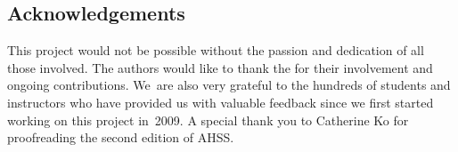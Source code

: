\subsection*{{\color{oiB}Acknowledgements}}

This project would not be possible without the passion
and dedication of all those involved.
The authors would like to thank the
for their involvement and ongoing contributions.
We~are also very grateful to the hundreds of students
and instructors who have provided us with valuable feedback
since we first started working on this project in~2009.
A special thank you to Catherine Ko for proofreading
the second edition of AHSS.




